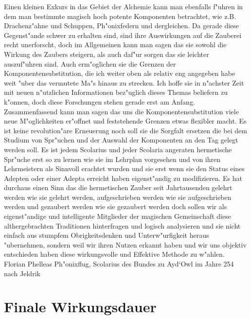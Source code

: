 \documentclass[a5paper,8pt]{book}
\begin{document}
Einen kleinen Exkurs in das Gebiet der Alchemie kann man ebenfalls f"uhren in dem man bestimmte magisch hoch potente Komponenten betrachtet, wie z.B. Drachenz"ahne und 
Schuppen, Ph"onixfedern und dergleichen. Da gerade diese Gegenst"ande schwer zu erhalten sind, sind ihre Auswirkungen auf die Zauberei recht unerforscht, doch im Allgemeinen 
kann man sagen das sie sowohl die Wirkung des Zaubers steigern, als auch daf"ur sorgen das sie leichter auszuf"uhren sind. Auch erm"oglichen sie die Grenzen der 
Komponentensubstitution, die ich weiter oben als relativ eng angegeben habe weit "uber das vermutete Ma"s hinaus zu strecken. Ich hoffe sie in n"achster Zeit mit neuen 
n"utzlichen 
Informationen bez"uglich dieses Themas beliefern zu k"onnen, doch diese Forschungen stehen gerade erst am Anfang.\\

Zusammenfassend kann man sagen das uns die Komponentensubstitution viele neue M"oglichkeiten er"offnet und feststehende Grenzen etwas flexibler macht. Es ist keine 
revolution"are Erneuerung noch soll sie die Sorgfalt ersetzen die bei dem Studium von Spr"uchen und der Auswahl der Komponenten an den Tag gelegt werden soll. Es ist jedem 
Scolarius und jeder Scolaria angeraten hermetische Spr"uche erst so zu lernen wie sie im Lehrplan vorgesehen und von ihren Lehrmeistern als Sinnvoll erachtet wurden und sie 
erst wenn sie den Status eines Adepten oder einer Adepta erreicht haben eigenst"andig zu modifizieren. Es hat durchaus einen Sinn das die hermetischen Zauber seit Jahrtausenden 
gelehrt werden wie sie gelehrt werden, aufgeschrieben werden wie sie aufgeschrieben werden und gezaubert werden wie sie gezaubert werden doch sollen wir als eigenst"andige und 
intelligente Mitglieder der magischen Gemeinschaft diese althergebrachten Traditionen hinterfragen und logisch analysieren und sie nicht einfach aus stumpfem 
Obrigkeitsdenken und Unterw"urfigkeit heraus "ubernehmen, sondern weil wir ihren Nutzen erkannt haben und wir uns objektiv entschieden haben diese wirkungsvolle und 
Effektive Methode zu w"ahlen.\\


Florian Phelleas Ph"onixflug, Scolarius des Bundes zu Ayd`Owl im Jahre 254 nach Jeldrik

\newpage

\section{Finale Wirkungsdauer}
\end{document}
